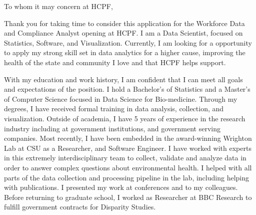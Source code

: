 \documentclass[11pt,twoside]{letter}
\begin{document}
\begin{letter}{}


\newcommand{\jname}
{Workforce Data and Compliance Analyst opening}
\newcommand{\cname}
{HCPF}
\opening
{To whom it may concern at \cname{},}
\newcommand{\cnameshort}
{HCPF}
\newcommand{\mytitle}
 {Data Scientist, focused on Statistics, Software, and Visualization}
\newcommand{\opportunity}
  {}
\newcommand{\degree}
 {Computer Science focused in Data Science for Bio-medicine}
\newcommand{\class}
  {data analysis, collection, and visualization}


\setlength{\parindent}{15pt} %

Thank you for taking time to consider this application for the \jname{} at \cname{}.
I am a \mytitle{}.
Currently, I am looking for a opportunity to apply my strong skill set in data
analytics for a higher cause, improving the health of the state and community I love and
that \cname{} helps
support.

With my education and work history, I am confident that I can meet all goals and expectations of the position.
I hold a Bachelor's of Statistics and a Master's of \degree{}.
Through my degrees, I have received formal training in \class{}.
Outside of academia, I have 5 years of experience in the research industry including at
government institutions, and government serving companies.
Most recently, I have been embedded in the award-winning Wrighton Lab at CSU as a Researcher, and Software Engineer.
I have worked with experts in this extremely interdisciplinary team to collect,
validate and analyze data in order to answer complex questions about environmental
health.
I helped with all parts of the data collection and processing pipeline in the lab,
including helping with publications. I presented my work at conferences and to
my colleagues.
Before returning to graduate school, I worked as Researcher at BBC Research to fulfill government
contracts for Disparity Studies.



\end{letter}
\end{document}
